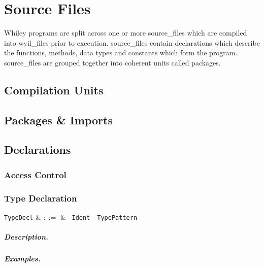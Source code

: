 \chapter{Source Files}

Whiley programs are split across one or more \gls{source_file}s which
are compiled into \gls{wyil_file}s prior to execution.
\Gls{source_file}s contain declarations which describe the functions,
methods, data types and constants which form the program.
\Gls{source_file}s are grouped together into coherent units called
\gls{package}s.


\section{Compilation Units}

\section{Packages \& Imports}

\section{Declarations}

\subsection{Access Control}


\subsection{Type Declaration}

\begin{syntax}
  \verb+TypeDecl+ & $::=$ & \ \verb+Ident+\ \
  \verb+TypePattern+\ \\
\end{syntax}

\paragraph{Description.}

\paragraph{Examples.}

